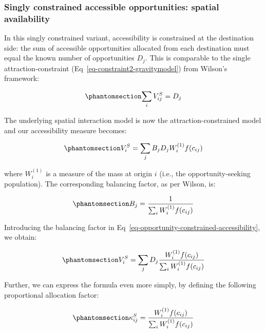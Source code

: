 \documentclass[
  10pt,
  letterpaper,
]{article}
\begin{document}
\subsubsection{Singly constrained accessible opportunities: spatial
availability}\label{singly-constrained-accessible-opportunities-spatial-availability}

In this singly constrained variant, accessibility is constrained at the
destination side: the sum of accessible opportunities allocated from
each destination must equal the known number of opportunities \(D_j\).
This is comparable to the single attraction-constraint
(Eq~\ref{eq-constraint2-gravitymodel}) from Wilson's framework:

\begin{equation}\phantomsection\label{eq-opportunity-constraint}{
\sum_i V^S_{ij} =  D_j
}\end{equation}

The underlying spatial interaction model is now the
attraction-constrained model and our accessibility measure becomes:

\begin{equation}\phantomsection\label{eq-opportunity-constrained-accessibility}{
V^S_{i} = \sum_j B_j D_j W_i^{(1)} f(c_{ij})
}\end{equation}

\noindent where \(W_i^{(1)}\) is a measure of the mass at origin \(i\)
(i.e., the opportunity-seeking population). The corresponding balancing
factor, as per Wilson, is:

\begin{equation}\phantomsection\label{eq-opportunity-constrained-proportionality-constants}{
B_j = \frac{1}{\sum_i W_i^{(1)} f(c_{ij})}
}\end{equation}

Introducing the balancing factor in
Eq~\ref{eq-opportunity-constrained-accessibility}, we obtain:

\begin{equation}\phantomsection\label{eq-opportunity-constrained-accessibility-with-balancing-factor}{
V^S_{i} = \sum_j D_j \frac{W_i^{(1)} f(c_{ij})}{\sum_i W_i^{(1)} f(c_{ij})}
}\end{equation}

Further, we can express the formula even more simply, by defining the
following proportional allocation factor:

\begin{equation}\phantomsection\label{eq-opportunity-constrained-proportional-allocation-factor}{
\kappa^S_{ij} = \frac{W_i^{(1)} f(c_{ij})}{\sum_i W_i^{(1)} f(c_{ij})}
}\end{equation}
\end{document}
